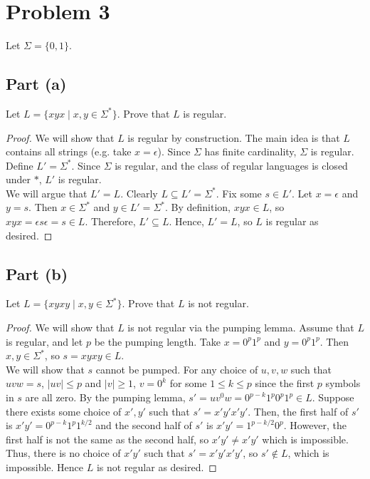 \documentclass{article}
\begin{document}
\section*{Problem 3}

Let $\Sigma = \{ 0, 1 \}$.

\subsection*{Part (a)}

Let $L = \{ xyx \mid x, y \in \Sigma^* \}$. Prove that $L$ is regular.

\begin{proof}
    We will show that $L$ is regular by construction. The main idea is that $L$ contains all strings (e.g. take $x = \epsilon$). Since $\Sigma$ has finite 
    cardinality, $\Sigma$ is regular. Define $L' = \Sigma^*$. Since $\Sigma$ is regular, and the class of regular languages is closed under $*$, $L'$ is 
    regular. \\
    
    \noindent
    We will argue that $L' = L$. Clearly $L \subseteq L' = \Sigma^*$. Fix some $s \in L'$. Let $x = \epsilon$ and $y = s$. Then $x \in \Sigma^*$ and 
    $y \in L' = \Sigma^*$. By definition, $xyx \in L$, so $xyx = \epsilon s \epsilon = s \in L$. Therefore, $L' \subseteq L$. Hence, $L' = L$, so $L$ is regular 
    as desired.
\end{proof}

\subsection*{Part (b)}

Let $L = \{ xyxy \mid x, y \in \Sigma^* \}$. Prove that $L$ is not regular. 

\begin{proof}
    We will show that $L$ is not regular via the pumping lemma. Assume that $L$ is regular, and let $p$ be the pumping length. Take $x = 0^p 1^p$ and 
    $y = 0^p 1^p$. Then $x, y \in \Sigma^*$, so $s = xyxy \in L$. \\

    \noindent
    We will show that $s$ cannot be pumped. For any choice of $u, v, w$ such that $uvw = s$, $|uv| \leq p$ and $|v| \geq 1$, $v = 0^k$ for some $1 \leq k \leq p$ since
    the first $p$ symbols in $s$ are all zero. By the pumping lemma, $s' = uv^0w = 0^{p - k} 1^p 0^p 1^p \in L$. Suppose there exists some choice of $x', y'$ 
    such that $s' = x' y' x' y'$. Then, the first half of $s'$ is $x' y' = 0^{p - k}1^{p} 1^{k/2}$ and the second half of $s'$ is $x'y' = 1^{p-k/2}0^p$. 
    However, the first half is not the same as the second half, so $x' y' \neq x' y'$ which is impossible. Thus, there is no choice of $x' y'$ such that  
    $s' = x' y' x' y'$, so $s' \not \in L$, which is impossible. Hence $L$ is not regular as desired.
\end{proof}
\end{document}
